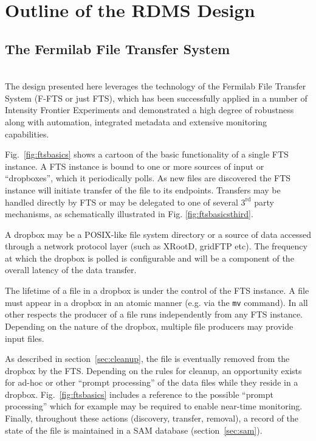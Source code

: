 \documentclass[12pt]{article}
\begin{document}
{%


\section{Outline of the RDMS Design}


\subsection{The Fermilab File Transfer System}
\ \\
The design presented here leverages the technology of the Fermilab
File Transfer System (F-FTS or just FTS), which has been successfully
applied in a number of Intensity Frontier Experiments and demonstrated
a high degree of robustness along with automation, integrated metadata
and extensive monitoring capabilities.

Fig.~\ref{fig:ftsbasics} shows a cartoon of the basic functionality
of a single FTS instance.  A FTS instance is bound to one or more
sources of input or ``dropboxes'', which it  periodically polls.
As new files are discovered the FTS instance will initiate transfer of the file to its endpoints.
Transfers may be handled directly by FTS or may be delegated to one of
several $3^\mathrm{rd}$ party mechanisms, as schematically illustrated
in  Fig. \ref{fig:ftsbasicsthird}.

A dropbox may be a POSIX-like file system directory or a source of data accessed
through a network protocol layer (such as  XRootD, gridFTP etc). The frequency at
which the dropbox is polled is configurable and will be a component of the overall latency
of the data transfer.

The lifetime of a file in a dropbox is under the control of the FTS
instance.  A file must appear in a dropbox in an atomic manner
(e.g. via the \texttt{mv} command). In all other respects the producer
of a file runs independently from any FTS instance.  Depending on the
nature of the dropbox, multiple file producers may provide input files.


As described in section~\ref{sec:cleanup}, the file is eventually removed from the
dropbox by the FTS.  Depending on the rules for cleanup, an opportunity
exists for ad-hoc or other ``prompt processing'' of the data files while
they reside in a dropbox. Fig.~\ref{fig:ftsbasics} includes a reference to the possible
``prompt processing'' which for example may be required to enable
near-time monitoring. Finally, throughout these actions (discovery, transfer,
removal), a record of the state of the file is maintained in a SAM
database (section~\ref{sec:sam}).

}
\end{document}
